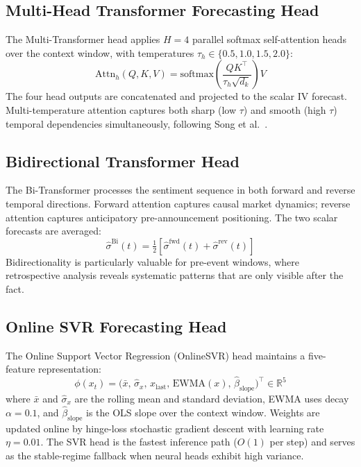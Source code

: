 \documentclass[10pt,twocolumn]{article}
\newcommand{\R}{\mathbb{R}}
\begin{document}
\subsection{Multi-Head Transformer Forecasting Head}

The Multi-Transformer head applies $H=4$ parallel softmax self-attention heads
over the context window, with temperatures $\tau_h\in\{0.5,1.0,1.5,2.0\}$:
\begin{equation}
\label{eq:attention}
\mathrm{Attn}_h(Q,K,V)=\mathrm{softmax}\!\left(\frac{QK^\top}{\tau_h\sqrt{d_k}}\right)V
\end{equation}
The four head outputs are concatenated and projected to the scalar IV
forecast. Multi-temperature attention captures both sharp (low $\tau$) and
smooth (high $\tau$) temporal dependencies simultaneously, following Song et
al.~\cite{song2025}.

\subsection{Bidirectional Transformer Head}

The Bi-Transformer processes the sentiment sequence in both forward and reverse
temporal directions. Forward attention captures causal market dynamics;
reverse attention captures anticipatory pre-announcement positioning. The
two scalar forecasts are averaged:
\begin{equation}
\hat{\sigma}^{\mathrm{Bi}}(t)=\tfrac{1}{2}\!\left[
  \hat{\sigma}^{\mathrm{fwd}}(t)+\hat{\sigma}^{\mathrm{rev}}(t)\right]
\end{equation}
Bidirectionality is particularly valuable for pre-event windows, where
retrospective analysis reveals systematic patterns that are only visible
after the fact.

\subsection{Online SVR Forecasting Head}

The Online Support Vector Regression (OnlineSVR) head maintains a five-feature
representation:
\begin{equation}
\phi(x_t)=\bigl(\bar{x},\,\hat{\sigma}_x,\,x_{\mathrm{last}},\,
\mathrm{EWMA}(x),\,\hat{\beta}_{\mathrm{slope}}\bigr)^\top\in\R^5
\end{equation}
where $\bar{x}$ and $\hat{\sigma}_x$ are the rolling mean and standard
deviation, EWMA uses decay $\alpha=0.1$, and $\hat{\beta}_{\mathrm{slope}}$
is the OLS slope over the context window. Weights are updated online by
hinge-loss stochastic gradient descent with learning rate $\eta=0.01$.
The SVR head is the fastest inference path ($O(1)$ per step) and serves as
the stable-regime fallback when neural heads exhibit high variance.
\end{document}
